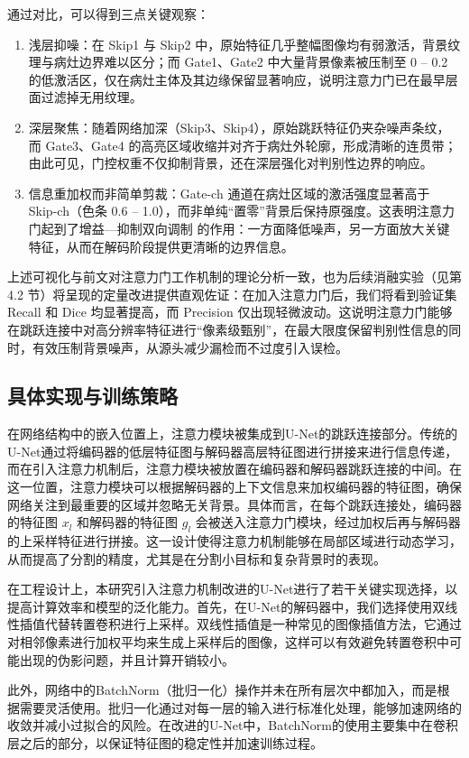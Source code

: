通过对比，可以得到三点关键观察：

\begin{enumerate}
    \item 浅层抑噪：在 Skip1 与 Skip2 中，原始特征几乎整幅图像均有弱激活，背景纹理与病灶边界难以区分；而 Gate1、Gate2 中大量背景像素被压制至 0 – 0.2 的低激活区，仅在病灶主体及其边缘保留显著响应，说明注意力门已在最早层面过滤掉无用纹理。
    
    \item 深层聚焦：随着网络加深（Skip3、Skip4），原始跳跃特征仍夹杂噪声条纹，而 Gate3、Gate4 的高亮区域收缩并对齐于病灶外轮廓，形成清晰的连贯带；由此可见，门控权重不仅抑制背景，还在深层强化对判别性边界的响应。
    
    \item 信息重加权而非简单剪裁：Gate-ch 通道在病灶区域的激活强度显著高于 Skip-ch（色条 0.6 – 1.0），而非单纯“置零”背景后保持原强度。这表明注意力门起到了增益—抑制双向调制 的作用：一方面降低噪声，另一方面放大关键特征，从而在解码阶段提供更清晰的边界信息。
\end{enumerate}

上述可视化与前文对注意力门工作机制的理论分析一致，也为后续消融实验（见第 4.2 节）将呈现的定量改进提供直观佐证：在加入注意力门后，我们将看到验证集 Recall 和 Dice 均显著提高，而 Precision 仅出现轻微波动。这说明注意力门能够在跳跃连接中对高分辨率特征进行“像素级甄别”，在最大限度保留判别性信息的同时，有效压制背景噪声，从源头减少漏检而不过度引入误检。

\subsection{具体实现与训练策略}

在网络结构中的嵌入位置上，注意力模块被集成到U-Net的跳跃连接部分。传统的U-Net通过将编码器的低层特征图与解码器高层特征图进行拼接来进行信息传递，而在引入注意力机制后，注意力模块被放置在编码器和解码器跳跃连接的中间。在这一位置，注意力模块可以根据解码器的上下文信息来加权编码器的特征图，确保网络关注到最重要的区域并忽略无关背景。具体而言，在每个跳跃连接处，编码器的特征图 $x_l$ 和解码器的特征图 $g_l$ 会被送入注意力门模块，经过加权后再与解码器的上采样特征进行拼接。这一设计使得注意力机制能够在局部区域进行动态学习，从而提高了分割的精度，尤其是在分割小目标和复杂背景时的表现。

在工程设计上，本研究引入注意力机制改进的U-Net进行了若干关键实现选择，以提高计算效率和模型的泛化能力。首先，在U-Net的解码器中，我们选择使用双线性插值代替转置卷积进行上采样。双线性插值是一种常见的图像插值方法，它通过对相邻像素进行加权平均来生成上采样后的图像，这样可以有效避免转置卷积中可能出现的伪影问题，并且计算开销较小。

此外，网络中的BatchNorm（批归一化）操作并未在所有层次中都加入，而是根据需要灵活使用。批归一化通过对每一层的输入进行标准化处理，能够加速网络的收敛并减小过拟合的风险。在改进的U-Net中，BatchNorm的使用主要集中在卷积层之后的部分，以保证特征图的稳定性并加速训练过程。